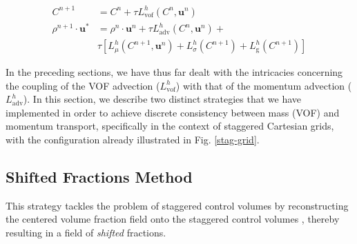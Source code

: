 

\begin{align}
	C^{n+1} &= C^{n} + \tau L^{h}_{\textrm{vof}}\left( C^{n},\boldsymbol{u}^{n}\right) \\  
	\rho^{n+1}\cdot \boldsymbol{u}^{*} &= \rho^{n}\cdot \boldsymbol{u}^{n} + \tau L^{h}_{\textrm{adv}}\left( C^{n},\boldsymbol{u}^{n} \right) + \nonumber \\
				      & \tau \left[ L^{h}_{\mu}\left(C^{n+1},\boldsymbol{u}^{n}\right) + L^{h}_{\sigma}\left(C^{n+1}\right) + L^{h}_{\textrm{g}}\left(C^{n+1}\right)\right]
\label{global_eqns}
\end{align}




In the preceding sections, we have thus far dealt with the 
intricacies concerning the coupling of the VOF advection ($L^{h}_{\textrm{vof}}$)  
with that of the momentum advection ($L^{h}_{\textrm{adv}}$). In this section, we
describe two distinct strategies that we have implemented in order to achieve 
discrete consistency between mass (VOF) and momentum transport, specifically 
in the context of staggered Cartesian grids, with the configuration
already illustrated in Fig. \ref{stag-grid}. 


\subsection*{Shifted Fractions Method}

This strategy tackles the problem of staggered control volumes by reconstructing 
the centered volume fraction field onto the staggered control volumes 
, thereby resulting in a field of \textit{shifted} fractions. 


